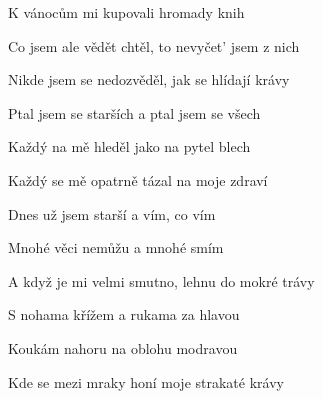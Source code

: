 \begin{song}
\bigskip

K vánocům mi kupovali hromady knih \par
Co jsem ale vědět chtěl, to nevyčet' jsem z nich \par
{}Nikde jsem se nedozvěděl,  jak se hlídají krávy \par
{}Ptal jsem se starších a ptal jsem se všech \par
Každý na mě hleděl jako na pytel blech \par
{}Každý se mě opatrně  tázal na moje zdraví  \par

\bigskip

\Refren

\bigskip

Dnes už jsem starší a vím, co vím \par
Mnohé věci nemůžu a mnohé smím \par
{}A když je mi velmi smutno,  lehnu do mokré trávy \par
{}S nohama křížem a rukama za hlavou \par
Koukám nahoru na oblohu modravou \par
{}Kde se mezi mraky honí  moje strakaté krávy  \par

\bigskip

\Refren {}

\end{song}
